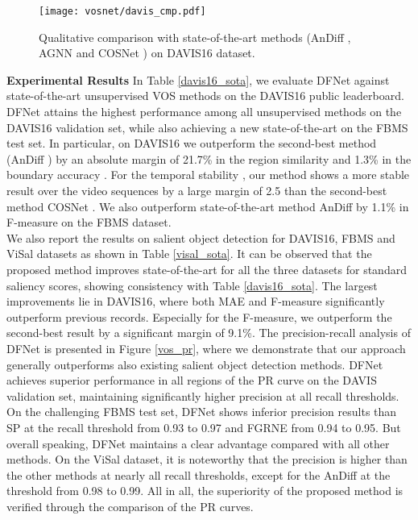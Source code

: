 \documentclass[runningheads]{llncs}
\begin{document}
\begin{figure*}[t!]
	\centering
	\texttt{[image: vosnet/davis\_cmp.pdf]}
	\caption{Qualitative comparison with state-of-the-art methods (AnDiff \cite{vos_andiff}, AGNN \cite{vos_agnn} and COSNet \cite{vos_cosnet}) on DAVIS16  dataset.   }
	\label{davis_cmp}
\end{figure*}
\noindent \textbf{Experimental Results } In Table \ref{davis16_sota}, we evaluate DFNet against state-of-the-art unsupervised VOS methods on the DAVIS16 public leaderboard. DFNet attains the highest performance among all unsupervised methods on the DAVIS16 validation set, while also achieving a new state-of-the-art on the FBMS test set. In particular, on DAVIS16 we outperform the second-best method (AnDiff \cite{vos_andiff}) by an absolute margin of 21.7\% in the  region similarity  and 1.3\% in the boundary accuracy . For the temporal stability , our method shows a more stable result over the video sequences by a large margin of 2.5  than the second-best method COSNet \cite{vos_cosnet}. We also outperform state-of-the-art method AnDiff \cite{vos_andiff} by 1.1\% in F-measure on the FBMS dataset.\\
\indent We also report the results on salient object detection for DAVIS16, FBMS and ViSal datasets as shown in Table \ref{visal_sota}. It can be observed that the proposed method improves state-of-the-art for all the three datasets for standard saliency scores, showing consistency with Table \ref{davis16_sota}. The largest improvements lie in DAVIS16, where both MAE and F-measure significantly outperform previous records. Especially for the F-measure, we outperform the second-best result by a significant margin of 9.1\%. The precision-recall analysis of DFNet is presented in Figure \ref{vos_pr}, where we demonstrate that our approach generally outperforms also existing salient object detection methods.
DFNet achieves superior performance in all regions of the PR curve on the DAVIS validation set, maintaining significantly higher precision at all recall thresholds. On the challenging FBMS test set, DFNet shows  inferior precision results than SP \cite{video_sp}at the recall threshold from 0.93 to 0.97 and FGRNE \cite{video_fgrne} from 0.94 to 0.95. But overall speaking,  DFNet maintains a clear advantage compared with all other methods. 
On the ViSal dataset, it is noteworthy that the precision is higher than the other methods at nearly all recall thresholds, except for the AnDiff \cite{vos_andiff} at the threshold from 0.98 to 0.99. All in all, the superiority of the proposed method is verified through the comparison of the PR curves.\\
\end{document}
